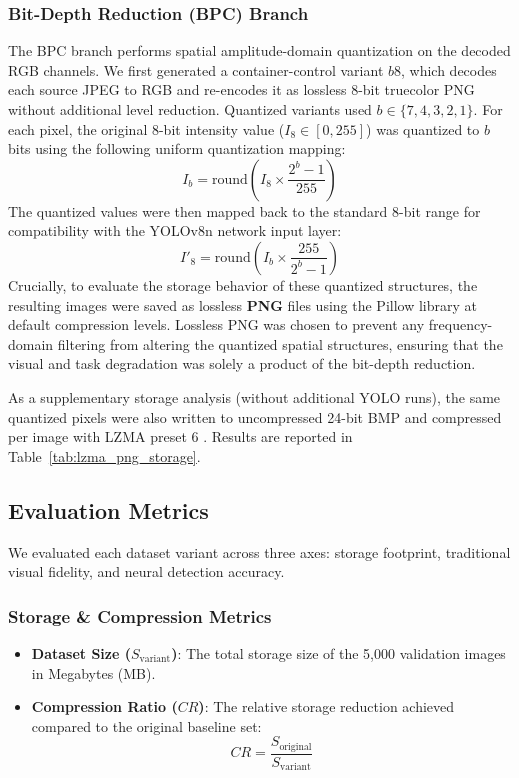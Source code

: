 \documentclass[12pt, a4paper]{article}
\begin{document}
\subsubsection{Bit-Depth Reduction (BPC) Branch}
The BPC branch performs spatial amplitude-domain quantization on the decoded RGB channels. We first generated a container-control variant $b8$, which decodes each source JPEG to RGB and re-encodes it as lossless 8-bit truecolor PNG without additional level reduction. Quantized variants used $b \in \{7, 4, 3, 2, 1\}$. For each pixel, the original 8-bit intensity value ($I_{8} \in [0, 255]$) was quantized to $b$ bits using the following uniform quantization mapping:
\begin{equation}
I_{b} = \text{round}\left(I_{8} \times \frac{2^b - 1}{255}\right)
\label{eq:quant}
\end{equation}
The quantized values were then mapped back to the standard 8-bit range for compatibility with the YOLOv8n network input layer:
\begin{equation}
I'_{8} = \text{round}\left(I_{b} \times \frac{255}{2^b - 1}\right)
\label{eq:dequant}
\end{equation}
Crucially, to evaluate the storage behavior of these quantized structures, the resulting images were saved as lossless \textbf{PNG} files using the Pillow library at default compression levels. Lossless PNG was chosen to prevent any frequency-domain filtering from altering the quantized spatial structures, ensuring that the visual and task degradation was solely a product of the bit-depth reduction.

As a supplementary storage analysis (without additional YOLO runs), the same quantized pixels were also written to uncompressed 24-bit BMP and compressed per image with LZMA preset 6 \cite{pavlov2013}. Results are reported in Table~\ref{tab:lzma_png_storage}.

\subsection{Evaluation Metrics}
We evaluated each dataset variant across three axes: storage footprint, traditional visual fidelity, and neural detection accuracy.

\subsubsection{Storage \& Compression Metrics}
\begin{itemize}
    \item \textbf{Dataset Size ($S_{\text{variant}}$)}: The total storage size of the 5,000 validation images in Megabytes (MB).
    \item \textbf{Compression Ratio ($CR$)}: The relative storage reduction achieved compared to the original baseline set:
    \begin{equation}
    CR = \frac{S_{\text{original}}}{S_{\text{variant}}}
    \label{eq:cr}
    \end{equation}
\end{itemize}
\end{document}
